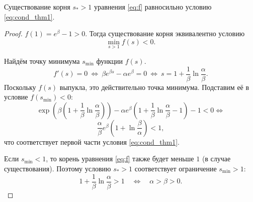 \begin{lemma}
	\label{lm:t1_existence}
	Существование корня $s_* > 1$ уравнения \eqref{eq:f} равносильно условию \eqref{eq:cond_thm1}.
\end{lemma}
\begin{proof}
	$f(1) = e^{\beta} - 1 > 0$. Тогда существование корня эквивалентно условию
	\begin{equation*}
		\min\limits_{s > 1}f(s) < 0.
	\end{equation*}
	
	Найдём точку минимума $s_{\min}$ функции $f(s)$.
	\begin{equation*}
		f'(s) = 0 \ \Leftrightarrow \ \beta e^{\beta s} - \alpha e^{\beta} = 0\ \Leftrightarrow\ s = 1 + \frac{1}{\beta}\ln\frac{\alpha}{\beta}.
	\end{equation*}
	Поскольку $f(s)$ выпукла, это действительно точка минимума. Подставим её в условие $f(s_{\min}) < 0$:
	\begin{equation*}
		\exp\left(\beta (1 + \frac{1}{\beta}\ln\frac{\alpha}{\beta}) \right) - \alpha e^{\beta}(1 + \frac{1}{\beta}\ln\frac{\alpha}{\beta} - 1) - 1 < 0 \Leftrightarrow
	\end{equation*}
	\begin{equation*}
		\frac{\alpha}{\beta}e^{\beta}\left(1 + \ln\frac{\beta}{\alpha}\right) < 1,
	\end{equation*}
	что соответствует первой части условия \eqref{eq:cond_thm1}.
	
	Если $s_{\min} < 1$, то корень уравнения \eqref{eq:f} также будет меньше $1$ (в случае существования). Поэтому условию $s_* > 1$ соответствует ограничение $s_{\min} > 1$:
	\begin{equation*}
		1 + \frac{1}{\beta}\ln\frac{\alpha}{\beta} > 1 \quad \Leftrightarrow \quad \alpha > \beta > 0.
	\end{equation*}
\end{proof}

